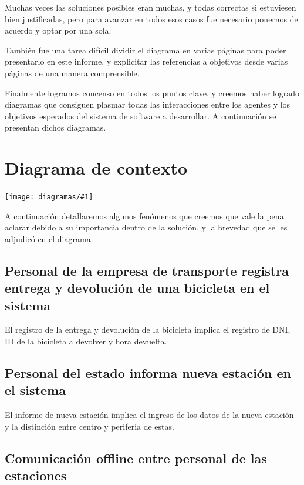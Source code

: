 \documentclass[a4paper, 10pt, twoside]{article}
\newcommand{\diagramah}[1]{
  \texttt{[image: diagramas/\#1]}
}
\begin{document}
Muchas veces las soluciones posibles eran muchas, y todas correctas si estuviesen bien justificadas, pero para avanzar en todos esos casos fue necesario ponernos de acuerdo y optar por una sola.

También fue una tarea difícil dividir el diagrama en varias páginas para poder presentarlo en este informe, y explicitar las referencias a objetivos desde varias páginas de una manera comprensible.

Finalmente logramos concenso en todos los puntos clave, y creemos haber logrado diagramas que consiguen plasmar todas las interacciones entre los agentes y los objetivos esperados del sistema de software a desarrollar. A continuación se presentan dichos diagramas.




\section{Diagrama de contexto}

\diagramah{contexto}

A continuación detallaremos algunos fenómenos que creemos que vale la pena aclarar debido a su importancia dentro de la solución, y la brevedad que se les adjudicó en el diagrama.


\subsection{Personal de la empresa de transporte registra entrega y devolución de una bicicleta en el sistema}

El registro de la entrega y devolución de la bicicleta implica el registro de DNI, ID de la bicicleta a devolver y hora devuelta.


\subsection{Personal del estado informa nueva estación en el sistema}

El informe de nueva estación implica el ingreso de los datos de la nueva estación y la distinción entre centro y periferia de estas.


\subsection{Comunicación offline entre personal de las estaciones}
\end{document}

